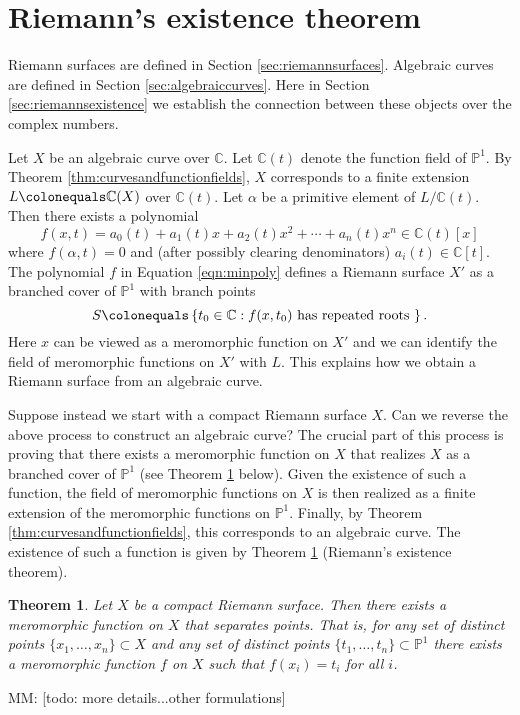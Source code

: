 \documentclass{dcthesis}
\newcommand{\PP}{\mathbb P}
\newcommand{\CC}{\mathbb C}
\newcommand{\mm}[1]{{\color{blue} \sf MM: [#1]}}
\numberwithin{equation}{section}
\newtheorem{theorem}[equation]{Theorem}
\theoremstyle{definition}
\theoremstyle{remark}
\begin{document}
{  \section{Riemann's existence theorem}{\label{sec:riemannsexistence}
    Riemann surfaces are defined in Section \ref{sec:riemannsurfaces}.
    Algebraic curves are defined in Section \ref{sec:algebraiccurves}.
    Here in Section \ref{sec:riemannsexistence}
    we establish the connection between these objects over the complex numbers.
    \par
    Let $X$ be an algebraic curve over $\CC$.
    Let $\CC(t)$ denote the function field of $\PP^1$.
    By Theorem \ref{thm:curvesandfunctionfields},
    $X$ corresponds to a finite extension $L\colonequals\CC(X)$
    over $\CC(t)$.
    Let $\alpha$ be a primitive element of $L/\CC(t)$.
    Then there exists a polynomial
    \begin{equation}
      \label{eqn:minpoly}
      f(x,t) = a_0(t)+a_1(t)x+a_2(t)x^2+\cdots+a_n(t)x^n\in\CC(t)[x]
    \end{equation}
    where $f(\alpha,t) = 0$ and (after possibly clearing denominators)
    $a_i(t) \in\CC[t]$.
    The polynomial $f$ in Equation \ref{eqn:minpoly}
    defines a Riemann surface $X'$
    as a branched cover of $\PP^1$
    with branch points
    \[
      S \colonequals\left\{t_0\in\CC : f(x,t_0) \text{ has repeated roots }\right\}.
    \]
    Here $x$ can be viewed as a meromorphic function on $X'$
    and we can identify the field of meromorphic functions on $X'$
    with $L$.
    This explains how we obtain a Riemann surface from an algebraic curve.
    \par
    Suppose instead we start with a compact Riemann surface $X$.
    Can we reverse the above process to construct an algebraic curve?
    The crucial part of this process is proving that
    there exists a meromorphic function on $X$ that realizes $X$
    as a branched cover of $\PP^1$
    (see Theorem \ref{thm:riemannsexistence} below).
    Given the existence of such a function,
    the field of meromorphic functions on $X$ is then realized
    as a finite extension of the meromorphic functions on $\PP^1$.
    Finally,
    by Theorem \ref{thm:curvesandfunctionfields},
    this corresponds to an algebraic curve.
    The existence of such a function
    is given by
    Theorem \ref{thm:riemannsexistence}
    (Riemann's existence theorem).
    \begin{theorem}\label{thm:riemannsexistence}
      Let $X$ be a compact Riemann surface.
      Then there exists a meromorphic function on $X$
      that separates points.
      That is, for any set of distinct points
      $\{x_1,\dots,x_n\}\subset X$
      and any set of distinct points
      $\{t_1,\dots,t_n\}\subset\PP^1$
      there exists a meromorphic function $f$
      on $X$ such that $f(x_i) = t_i$ for all $i$.
    \end{theorem}
    \mm{todo: more details...other formulations}
  }
}
\end{document}
